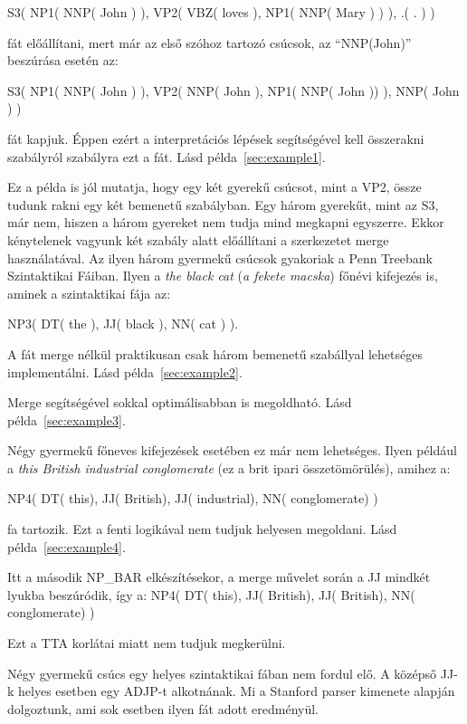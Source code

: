 S3( NP1( NNP( John ) ), VP2( VBZ( loves ),  NP1( NNP( Mary ) ) ), .( . ) )

fát előállítani, mert már az első szóhoz tartozó csúcsok, az “NNP(John)” beszúrása esetén az:

S3( NP1( NNP( John ) ), VP2( NNP( John ),  NP1( NNP( John )) ), NNP( John ) )

fát kapjuk. Éppen ezért a interpretációs lépések segítségével kell összerakni szabályról szabályra ezt a fát. Lásd példa~\ref{sec:example1}.

Ez a példa is jól mutatja, hogy egy két gyerekű csúcsot, mint a VP2, össze tudunk rakni egy két bemenetű szabályban. Egy három gyerekűt, mint az S3, már nem, hiszen a három gyereket nem tudja mind megkapni egyszerre. Ekkor kénytelenek vagyunk két szabály alatt előállítani a szerkezetet merge használatával. Az ilyen három gyermekű csúcsok gyakoriak a Penn Treebank Szintaktikai Fáiban.  Ilyen a \textit{the black cat} (\textit{a fekete macska}) főnévi kifejezés is, aminek a szintaktikai fája az:

NP3( DT( the ), JJ( black ), NN( cat ) ).

A fát merge nélkül praktikusan csak három bemenetű szabállyal lehetséges implementálni.
Lásd példa~\ref{sec:example2}.

Merge segítségével sokkal optimálisabban is megoldható. Lásd példa~\ref{sec:example3}.

Négy gyermekű főneves kifejezések esetében ez már nem lehetséges. Ilyen például a \textit{this British industrial conglomerate} (ez a brit ipari összetömörülés), amihez  a:

NP4( DT( this), JJ( British), JJ( industrial), NN( conglomerate) )

fa tartozik. Ezt a fenti logikával nem tudjuk helyesen megoldani. Lásd példa~\ref{sec:example4}.

Itt a második NP\_BAR elkészítésekor, a merge művelet során a JJ  mindkét lyukba beszúródik, így a: NP4( DT( this), JJ( British), JJ( British), NN( conglomerate) )

Ezt a TTA korlátai miatt nem tudjuk megkerülni.

Négy gyermekű csúcs egy helyes szintaktikai fában nem fordul elő. A középső JJ-k helyes esetben egy ADJP-t alkotnának. Mi a Stanford parser kimenete alapján dolgoztunk, ami sok esetben ilyen fát adott eredményül.


